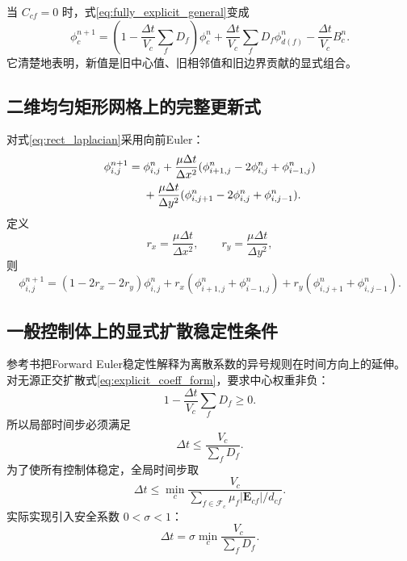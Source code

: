 \documentclass[UTF8,12pt,a4paper]{ctexart}
\numberwithin{equation}{section}
\newcommand{\Ef}{\bm E}
\begin{document}
当 $C_{cf}=0$ 时，式\eqref{eq:fully_explicit_general}变成
\begin{equation}
  \phi_c^{n+1}
  =\left(1-\frac{\Delta t}{V_c}\sum_fD_f\right)\phi_c^n
  +\frac{\Delta t}{V_c}\sum_fD_f\phi_{d(f)}^n
  -\frac{\Delta t}{V_c}B_c^n.
  \label{eq:explicit_coeff_form}
\end{equation}
它清楚地表明，新值是旧中心值、旧相邻值和旧边界贡献的显式组合。

\subsection{二维均匀矩形网格上的完整更新式}

对式\eqref{eq:rect_laplacian}采用向前Euler：
\begin{align}
  \phi_{i,j}^{n+1}
  ={}&\phi_{i,j}^n
  +\frac{\mu\Delta t}{\Delta x^2}
  (\phi_{i+1,j}^n-2\phi_{i,j}^n+\phi_{i-1,j}^n)
  \notag\\
  &+\frac{\mu\Delta t}{\Delta y^2}
  (\phi_{i,j+1}^n-2\phi_{i,j}^n+\phi_{i,j-1}^n).
  \label{eq:2d_explicit}
\end{align}
定义
\begin{equation}
  r_x=\frac{\mu\Delta t}{\Delta x^2},
  \qquad
  r_y=\frac{\mu\Delta t}{\Delta y^2},
  \label{eq:rx_ry}
\end{equation}
则
\begin{equation}
  \boxed{
  \phi_{i,j}^{n+1}
  =(1-2r_x-2r_y)\phi_{i,j}^n
  +r_x(\phi_{i+1,j}^n+\phi_{i-1,j}^n)
  +r_y(\phi_{i,j+1}^n+\phi_{i,j-1}^n)}.
  \label{eq:2d_explicit_weights}
\end{equation}

\subsection{一般控制体上的显式扩散稳定性条件}

参考书把Forward Euler稳定性解释为离散系数的异号规则在时间方向上的延伸。对无源正交扩散式\eqref{eq:explicit_coeff_form}，要求中心权重非负：
\begin{equation}
  1-\frac{\Delta t}{V_c}\sum_fD_f\geq0.
  \label{eq:positive_center_weight}
\end{equation}
所以局部时间步必须满足
\begin{equation}
  \Delta t\leq\frac{V_c}{\sum_fD_f}.
  \label{eq:local_dt_bound}
\end{equation}
为了使所有控制体稳定，全局时间步取
\begin{equation}
  \boxed{
  \Delta t
  \leq
  \min_c
  \frac{V_c}{
  \displaystyle\sum_{f\in\mathcal F_c}
  \mu_f|\Ef_{cf}|/d_{cf}}}.
  \label{eq:global_dt_bound}
\end{equation}
实际实现引入安全系数 $0<\sigma<1$：
\begin{equation}
  \boxed{
  \Delta t
  =\sigma
  \min_c
  \frac{V_c}{\sum_fD_f}}.
  \label{eq:safe_dt}
\end{equation}
\end{document}
